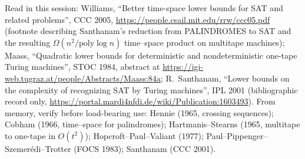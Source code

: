 \documentclass[11pt]{article}
\theoremstyle{remark}
\begin{document}
Read in this session: Williams, ``Better time-space lower bounds for SAT and related problems'', CCC 2005,
\url{https://people.csail.mit.edu/rrw/ccc05.pdf} (footnote describing Santhanam's reduction from
PALINDROMES to SAT and the resulting $\Omega(n^2/\mathrm{poly}\log n)$ time--space product on multitape
machines); Maass, ``Quadratic lower bounds for deterministic and nondeterministic one-tape Turing machines'',
STOC 1984, abstract at \url{https://igi-web.tugraz.at/people/Abstracts/Maass:84a}; R.~Santhanam, ``Lower bounds
on the complexity of recognizing SAT by Turing machines'', IPL 2001 (bibliographic record only,
\url{https://portal.mardi4nfdi.de/wiki/Publication:1603493}).
From memory, verify before load-bearing use: Hennie (1965, crossing sequences); Cobham (1966,
time--space for palindromes); Hartmanis--Stearns (1965, multitape to one-tape in $O(t^2)$);
Hopcroft--Paul--Valiant (1977); Paul--Pippenger--Szemer\'edi--Trotter (FOCS 1983); Santhanam (CCC 2001).
\end{document}
